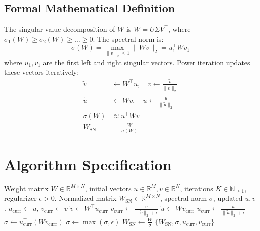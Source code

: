 \documentclass[11pt,a4paper]{article}
\theoremstyle{definition}
\begin{document}
\subsection{Formal Mathematical Definition}
The singular value decomposition of $W$ is $W = U \Sigma V^\top$, where $\sigma_1(W) \ge \sigma_2(W) \ge \dots \ge 0$.
The spectral norm is:
\begin{equation}
\sigma(W) = \max_{\|v\|_2 \le 1} \|W v\|_2 = u_1^\top W v_1
\end{equation}
where $u_1, v_1$ are the first left and right singular vectors.
Power iteration updates these vectors iteratively:
\begin{align}
\tilde{v} &\leftarrow W^\top u, \quad v \leftarrow \frac{\tilde{v}}{\|\tilde{v}\|_2} \\
\tilde{u} &\leftarrow W v, \quad u \leftarrow \frac{\tilde{u}}{\|\tilde{u}\|_2} \\
\sigma(W) &\approx u^\top W v \\
W_{\text{SN}} &= \frac{W}{\sigma(W)}
\end{align}

\section{Algorithm Specification}

\begin{algorithm}[H]
\caption{Spectral Normalization via Power Iteration}
\label{alg:spectral_norm}
\begin{algorithmic}[1]
\Require Weight matrix $W \in \mathbb{R}^{M \times N}$, initial vectors $u \in \mathbb{R}^M, v \in \mathbb{R}^N$, iterations $K \in \mathbb{N}_{\ge 1}$, regularizer $\epsilon > 0$.
\Ensure Normalized matrix $W_{\text{SN}} \in \mathbb{R}^{M \times N}$, spectral norm $\sigma$, updated $u, v$.
\State $u_{\text{curr}} \gets u$, $v_{\text{curr}} \gets v$
    \State $\tilde{v} \gets W^\top u_{\text{curr}}$
    \State $v_{\text{curr}} \gets \frac{\tilde{v}}{\|\tilde{v}\|_2 + \epsilon}$
    \State $\tilde{u} \gets W v_{\text{curr}}$
    \State $u_{\text{curr}} \gets \frac{\tilde{u}}{\|\tilde{u}\|_2 + \epsilon}$
\EndFor
\State $\sigma \gets u_{\text{curr}}^\top (W v_{\text{curr}})$
\State $\sigma \gets \max(\sigma, \epsilon)$
\State $W_{\text{SN}} \gets \frac{W}{\sigma}$
\State \Return $\{W_{\text{SN}}, \sigma, u_{\text{curr}}, v_{\text{curr}}\}$
\end{algorithmic}
\end{algorithm}
\end{document}
